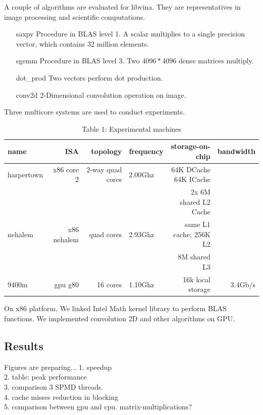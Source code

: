 \documentclass[10pt, conference, compsocconf]{IEEEtran}
\begin{document}
A couple of algorithms are evaluated for libvina.  They are representatives in image processing and scientific computations. 
\begin{itemize}
\item[saxpy] Procedure in BLAS level 1. A scalar multiplies to a single precision vector, which contains 32 million elements.
\item[sgemm] Procedure in BLAS level 3. Two $4096*4096$ dense matrices multiply.
\item[dot\_prod] Two vectors perform dot production.
\item[conv2d] 2-Dimensional convolution operation on image.
\end{itemize}

Three multicore systems are used to conduct experiments. 
\begin{table}[hb]
\caption{Table 1: Experimental machines}
\begin{center}
\begin{tabular}{|l|r|r|l|r|r|}
\hline
name       & ISA         & topology   & frequency  & storage-on-chip & bandwidth      \\
\hline 
harpertown & x86 core 2  & 2-way quad cores & 2.00Ghz & 64K DCache 64K ICache &         \\
           &             &                  &         & 2x 6M shared L2 Cache &         \\
\hline
nehalem    & x86 nehalem & quad cores       & 2.93Ghz & same L1 cache; 256K L2&         \\
           &             &                  &         & 8M shared L3          &         \\
\hline
9400m      & gpu g80     & 16 cores         & 1.10Ghz & 16k local storage     & 3.4Gb/s \\
\hline
\end{tabular} 
\end{center}
\end{table}
On x86 platform, We linked Intel Math kernel library to perform BLAS functions. We implemented convolution 2D and other algorithms on GPU. 

\subsection{Results}
Figures are preparing...
1. speedup\\
2. table: peak performance\\
3. comparison 3 SPMD threads.\\
4. cache misses reduction in blocking\\
5. comparison between gpu and cpu. matrix-multiplications?
\end{document}
